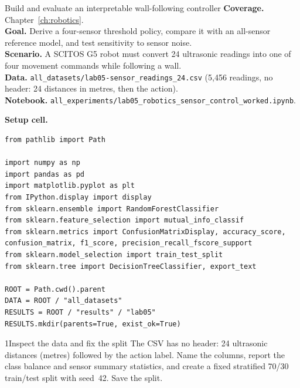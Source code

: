 
\begin{labproject}{Build and evaluate an interpretable wall-following controller}
\textbf{Coverage.} Chapter~\ref{ch:robotics}.\\
\textbf{Goal.} Derive a four-sensor threshold policy, compare it with an all-sensor reference model, and test sensitivity to sensor noise.\\
\textbf{Scenario.} A SCITOS G5 robot must convert 24 ultrasonic readings into one of four movement commands while following a wall.\\
\textbf{Data.} \texttt{all\_datasets/lab05-sensor\_readings\_24.csv} (5,456 readings, no header: 24 distances in metres, then the action).\\
\textbf{Notebook.} \texttt{all\_experiments/lab05\_robotics\_sensor\_control\_worked.ipynb}.
\end{labproject}

\noindent\textbf{Setup cell.}
\begin{lstlisting}[style=utppython]
from pathlib import Path

import numpy as np
import pandas as pd
import matplotlib.pyplot as plt
from IPython.display import display
from sklearn.ensemble import RandomForestClassifier
from sklearn.feature_selection import mutual_info_classif
from sklearn.metrics import ConfusionMatrixDisplay, accuracy_score, confusion_matrix, f1_score, precision_recall_fscore_support
from sklearn.model_selection import train_test_split
from sklearn.tree import DecisionTreeClassifier, export_text

ROOT = Path.cwd().parent
DATA = ROOT / "all_datasets"
RESULTS = ROOT / "results" / "lab05"
RESULTS.mkdir(parents=True, exist_ok=True)
\end{lstlisting}

\begin{labquestion}{1}{Inspect the data and fix the split}
The CSV has no header: 24 ultrasonic distances (metres) followed by the action label. Name the columns, report the class balance and sensor summary statistics, and create a fixed stratified 70/30 train/test split with seed~42. Save the split.
\end{labquestion}

